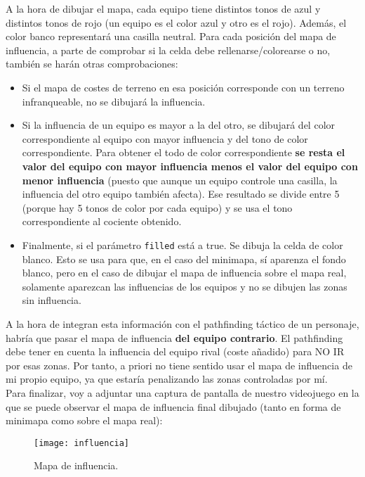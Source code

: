 A la hora de dibujar el mapa, cada equipo tiene distintos tonos de azul y distintos tonos de rojo (un equipo es el color azul y otro es el rojo). Además, el color banco representará una casilla neutral. Para cada posición del mapa de influencia, a parte de comprobar si la celda debe rellenarse/colorearse o no, también se harán otras comprobaciones:
\begin{itemize}
	\item Si el mapa de costes de terreno en esa posición corresponde con un terreno infranqueable, no se dibujará la influencia.
	\item Si la influencia de un equipo es mayor a la del otro, se dibujará del color correspondiente al equipo con mayor influencia y del tono de color correspondiente. Para obtener el todo de color correspondiente \textbf{se resta el valor del equipo con mayor influencia menos el valor del equipo con menor influencia} (puesto que aunque un equipo controle una casilla, la influencia del otro equipo también afecta). Ese resultado se divide entre 5 (porque hay 5 tonos de color por cada equipo) y se usa el tono correspondiente al cociente obtenido.
	\item Finalmente, si el parámetro \texttt{filled} está a true. Se dibuja la celda de color blanco. Esto se usa para que, en el caso del minimapa, sí aparenza el fondo blanco, pero en el caso de dibujar el mapa de influencia sobre el mapa real, solamente aparezcan las influencias de los equipos y no se dibujen las zonas sin influencia.
\end{itemize}

A la hora de integran esta información con el pathfinding táctico de un personaje, habría que pasar el mapa de influencia \textbf{del equipo contrario}. El pathfinding debe tener en cuenta la influencia del equipo rival (coste añadido) para NO IR por esas zonas. Por tanto, a priori no tiene sentido usar el mapa de influencia de mi propio equipo, ya que estaría penalizando las zonas controladas por mí. \\

Para finalizar, voy a adjuntar una captura de pantalla de nuestro videojuego en la que se puede observar el mapa de influencia final dibujado (tanto en forma de minimapa como sobre el mapa real):
\begin{figure}[!th]
\texttt{[image: influencia]}
\centering
\caption{Mapa de influencia.}
\label{mapa:mapa}
\end{figure}